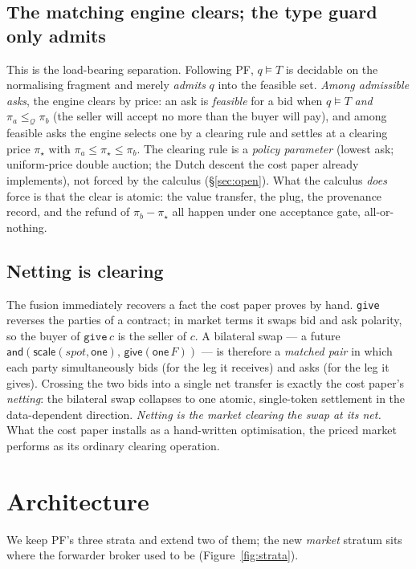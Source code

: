 \documentclass[11pt]{article}
\theoremstyle{definition}
\newcommand{\PF}{\textsf{PF}}
\newcommand{\Qval}{\mathcal{Q}}            %
\newcommand{\modelsT}{\models}
\begin{document}
\subsection{The matching engine clears; the type guard only admits}
This is the load-bearing separation. Following \PF{}, $q \modelsT T$ is decidable on the normalising
fragment and merely \emph{admits} $q$ into the feasible set. \emph{Among admissible asks}, the
engine clears by price: an ask is \emph{feasible} for a bid when $q \modelsT T$ \emph{and}
$\pi_a \le_{\Qval} \pi_b$ (the seller will accept no more than the buyer will pay), and among
feasible asks the engine selects one by a clearing rule and settles at a clearing price
$\pi_\star$ with $\pi_a \le \pi_\star \le \pi_b$. The clearing rule is a \emph{policy parameter}
(lowest ask; uniform-price double auction; the Dutch descent the cost paper already implements), not
forced by the calculus (\S\ref{sec:open}). What the calculus \emph{does} force is that the clear is
atomic: the value transfer, the plug, the provenance record, and the refund of $\pi_b - \pi_\star$
all happen under one acceptance gate, all-or-nothing.

\subsection{Netting is clearing}\label{sec:netting}
The fusion immediately recovers a fact the cost paper proves by hand. \texttt{give} reverses the
parties of a contract; in market terms it swaps bid and ask polarity, so the buyer of $\texttt{give}\,c$
is the seller of $c$. A bilateral swap --- a future
$\textsf{and}(\textsf{scale}(\textit{spot},\textsf{one}),\,\textsf{give}(\textsf{one}\,F))$ --- is
therefore a \emph{matched pair} in which each party simultaneously bids (for the leg it receives) and
asks (for the leg it gives). Crossing the two bids into a single net transfer is exactly the cost
paper's \emph{netting}: the bilateral swap collapses to one atomic, single-token settlement in the
data-dependent direction. \emph{Netting is the market clearing the swap at its net.} What the cost
paper installs as a hand-written optimisation, the priced market performs as its ordinary clearing
operation.

\section{Architecture}\label{sec:arch}
We keep \PF{}'s three strata and extend two of them; the new \emph{market} stratum sits where the
forwarder broker used to be (Figure~\ref{fig:strata}).
\end{document}
